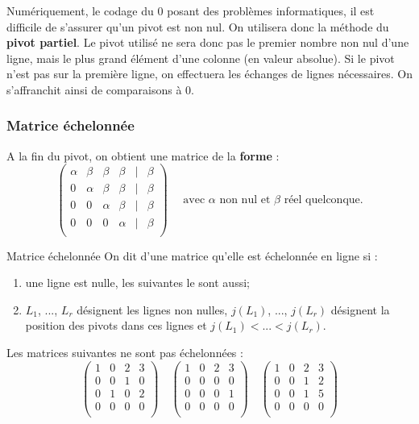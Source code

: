 \begin{rem}
Numériquement, le codage du 0 posant des problèmes informatiques, il est difficile de s'assurer qu'un pivot est non nul. On utilisera donc la méthode du \textbf{pivot partiel}. Le pivot utilisé ne sera donc pas le premier nombre non nul d'une ligne, mais le plus grand élément d'une colonne (en valeur absolue). Si le pivot n'est pas sur la première ligne, on effectuera les échanges de lignes nécessaires. On s'affranchit ainsi de comparaisons à 0. 

\end{rem}
\subsubsection{Matrice échelonnée}
A la fin du pivot, on obtient une matrice de la \textbf{forme} :
$$
\begin{pmatrix}
\alpha &\beta & \beta & \beta &  | &\beta \\
0  & \alpha & \beta  &  \beta   &  | & \beta \\
0 & 0 &   \alpha& \beta &  | &\beta  \\
0 & 0 & 0 & \alpha &   | &\beta\\
\end{pmatrix}
\quad 
\text{ avec }\alpha \text{ non nul et }\beta \text{ réel quelconque.}
$$

\begin{defi}{Matrice échelonnée}
On dit d'une matrice qu'elle est échelonnée en ligne si :
\begin{enumerate}
\item une ligne est nulle, les suivantes le sont aussi;
\item $L_1$, ..., $L_r$ désignent les lignes non nulles, $j(L_1)$, ..., $j(L_r)$ désignent la position des pivots dans ces lignes et $j(L_1)<...<j(L_r)$. 
\end{enumerate}
\end{defi}

\begin{exemple}
Les matrices suivantes ne sont pas échelonnées : 
$$
\begin{pmatrix}
1 & 0 & 2 & 3\\
0 & 0 & 1 & 0\\
0 & 1 & 0 & 2\\
0 & 0 & 0 & 0\\
\end{pmatrix}
\quad
\begin{pmatrix}
1 & 0 & 2 & 3\\
0 & 0 & 0 & 0\\
0 & 0 & 0 & 1\\
0 & 0 & 0 & 0\\
\end{pmatrix}
\quad
\begin{pmatrix}
1 & 0 & 2 & 3\\
0 & 0 & 1 & 2\\
0 & 0 & 1 & 5\\
0 & 0 & 0 & 0\\
\end{pmatrix}
$$
\end{exemple}

